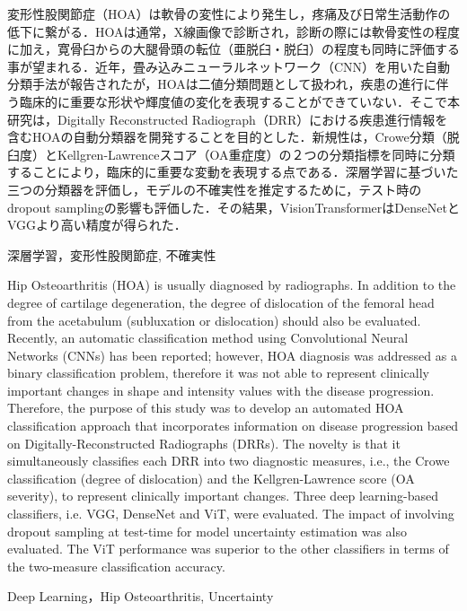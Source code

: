 \documentclass[technicalreport]{ieicej}
\begin{document}
\begin{jabstract}
変形性股関節症（HOA）は軟骨の変性により発生し，疼痛及び日常生活動作の低下に繋がる．HOAは通常，X線画像で診断され，診断の際には軟骨変性の程度に加え，寛骨臼からの大腿骨頭の転位（亜脱臼・脱臼）の程度も同時に評価する事が望まれる．近年，畳み込みニューラルネットワーク（CNN）を用いた自動分類手法が報告されたが，HOAは二値分類問題として扱われ，疾患の進行に伴う臨床的に重要な形状や輝度値の変化を表現することができていない．そこで本研究は，Digitally Reconstructed Radiograph（DRR）における疾患進行情報を含むHOAの自動分類器を開発することを目的とした．新規性は，Crowe分類（脱臼度）とKellgren-Lawrenceスコア（OA重症度）の２つの分類指標を同時に分類することにより，臨床的に重要な変動を表現する点である．深層学習に基づいた三つの分類器を評価し，モデルの不確実性を推定するために，テスト時のdropout samplingの影響も評価した．その結果，VisionTransformerはDenseNetとVGGより高い精度が得られた．
\end{jabstract}
\begin{jkeyword}
深層学習，変形性股関節症, 不確実性
\end{jkeyword}
\begin{eabstract}
Hip Osteoarthritis (HOA) is usually diagnosed by radiographs. In addition to the degree of cartilage degeneration, the degree of dislocation of the femoral head from the acetabulum (subluxation or dislocation) should also be evaluated. Recently, an automatic classification method using Convolutional Neural Networks (CNNs) has been reported; however, HOA diagnosis was addressed as a binary classification problem, therefore it was not able to represent clinically important changes in shape and intensity values with the disease progression. Therefore, the purpose of this study was to develop an automated HOA classification approach that incorporates information on disease progression based on Digitally-Reconstructed Radiographs (DRRs). The novelty is that it simultaneously classifies each DRR into two diagnostic measures, i.e., the Crowe classification (degree of dislocation) and the Kellgren-Lawrence score (OA severity), to represent clinically important changes. Three deep learning-based classifiers, i.e. VGG, DenseNet and ViT, were evaluated. The impact of involving dropout sampling at test-time for model uncertainty estimation was also evaluated. The ViT performance was superior to the other classifiers in terms of the two-measure classification accuracy.
\end{eabstract}
\begin{ekeyword}
Deep Learning，Hip Osteoarthritis, Uncertainty
\end{ekeyword}
\maketitle
\end{document}
